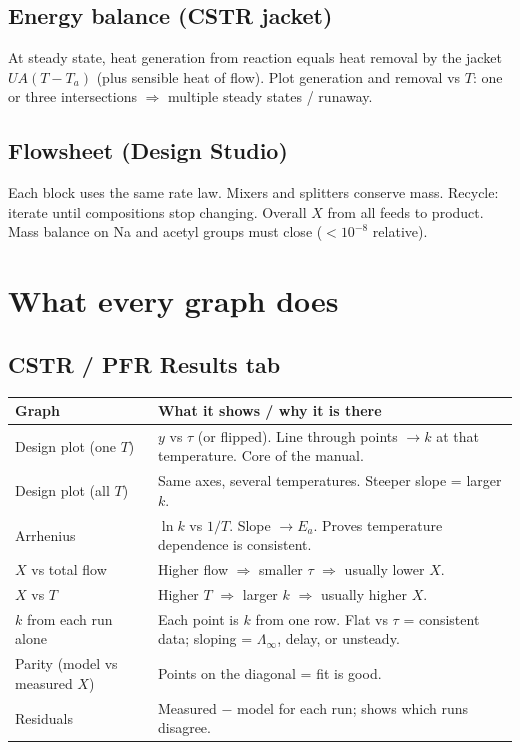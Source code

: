 \documentclass[11pt,a4paper]{article}
\begin{document}
\subsection{Energy balance (CSTR jacket)}
At steady state, heat generation from reaction equals heat removal by the jacket \(UA(T-T_a)\) (plus sensible heat of
flow). Plot generation and removal vs \(T\): one or three intersections \(\Rightarrow\) multiple steady states / runaway.

\subsection{Flowsheet (Design Studio)}
Each block uses the same rate law. Mixers and splitters conserve mass. Recycle: iterate until compositions stop changing.
Overall \(X\) from all feeds to product. Mass balance on Na and acetyl groups must close (\(<10^{-8}\) relative).

\section{What every graph does}

\subsection{CSTR / PFR Results tab}
\begin{tabularx}{\textwidth}{@{}l L@{}}
\toprule
\textbf{Graph} & \textbf{What it shows / why it is there} \\
\midrule
Design plot (one \(T\)) & \(y\) vs \(\tau\) (or flipped). Line through points \(\to k\) at that temperature. Core of the manual. \\
Design plot (all \(T\)) & Same axes, several temperatures. Steeper slope = larger \(k\). \\
Arrhenius & \(\ln k\) vs \(1/T\). Slope \(\to E_a\). Proves temperature dependence is consistent. \\
\(X\) vs total flow & Higher flow \(\Rightarrow\) smaller \(\tau\) \(\Rightarrow\) usually lower \(X\). \\
\(X\) vs \(T\) & Higher \(T\) \(\Rightarrow\) larger \(k\) \(\Rightarrow\) usually higher \(X\). \\
\(k\) from each run alone & Each point is \(k\) from one row. Flat vs \(\tau\) = consistent data; sloping = \(\Lambda_\infty\), delay, or unsteady. \\
Parity (model vs measured \(X\)) & Points on the diagonal = fit is good. \\
Residuals & Measured \(-\) model for each run; shows which runs disagree. \\
\bottomrule
\end{tabularx}
\end{document}

